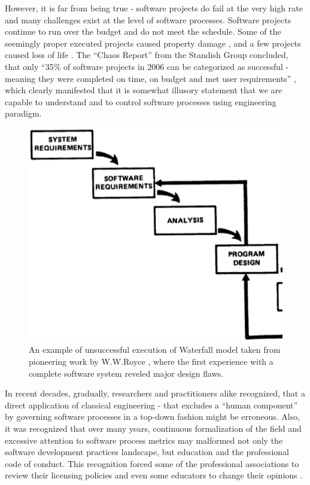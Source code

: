 However, it is far from being true - software projects do fail at the very high rate and many challenges 
exist at the level of software processes. Software projects continue to run over the budget and do not 
meet the schedule. Some of the seemingly proper executed projects caused property 
damage \cite{citeulike:11044022}, and a few projects caused loss of life \cite{citeulike:712058}. 
The ``Chaos Report'' from the Standish Group concluded, that only ``35\% of software projects in 2006 
can be categorized as successful - meaning they were completed on time, on budget and met 
user requirements'' \cite{chaos2006}, which clearly manifested that it is somewhat illusory statement 
that we are capable to understand and to control software processes using engineering paradigm.

\begin{figure}[ht!]
   \centering
   \includegraphics[width=140mm]{figures/waterfall.ps}
   \caption{An example of unsuccessful execution of Waterfall model taken from pioneering work by W.W.Royce 
   \cite{citeulike:9982731}, where the first experience with a complete software system reveled major design flaws.}
   \label{fig:kernel}
\end{figure}

In recent decades, gradually, researchers and practitioners alike recognized, that a direct application 
of classical engineering - that excludes a ``human component'' by governing software processes 
in a top-down fashion might be erroneous. 
Also, it was recognized that over many years, continuous formalization of the field and 
excessive attention to software process metrics may malformed not only the software development 
practices landscape, but education and the professional code of conduct. 
This recognition forced some of the professional associations to review their licensing policies 
\cite{citeulike:11045517} and even some educators to change their opinions \cite{citeulike:5203446}. 

